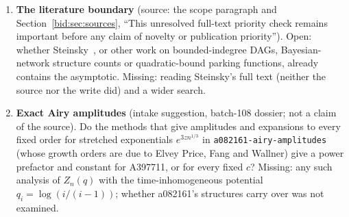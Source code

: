 \documentclass[11pt,letterpaper]{article}
\numberwithin{equation}{section}
\theoremstyle{remark}\newtheorem{remark}[theorem]{Remark}
\newcommand{\file}[1]{\nolinkurl{#1}}
\begin{document}
\begin{enumerate}
\item\label{bid:q:literature} \textbf{The literature boundary} (source:
 the scope paragraph and Section~\ref{bid:sec:sources}, ``This unresolved
 full-text priority check remains important before any claim of novelty or
 publication priority''). Open: whether Steinsky~\cite{steinsky}, or other
 work on bounded-indegree DAGs, Bayesian-network structure counts or
 quadratic-bound parking functions, already contains the asymptotic. Missing:
 reading Steinsky's full text (neither the source nor the write did) and a
 wider search.
\item\label{bid:q:amplitude} \textbf{Exact Airy amplitudes} (intake
 suggestion, batch-108 dossier; not a claim of the source). Do the methods
 that give amplitudes and expansions to every fixed order for stretched
 exponentials $e^{3zn^{1/3}}$ in \file{a082161-airy-amplitudes} (whose
 growth orders are due to Elvey Price, Fang and Wallner) give a power
 prefactor and constant for A397711, or for every fixed $c$? Missing: any
 such analysis of $Z_n(q)$ with the time-inhomogeneous potential
 $q_i=\log(i/(i-1))$; whether a082161's structures carry over was not
 examined.
\end{enumerate}
\end{document}
